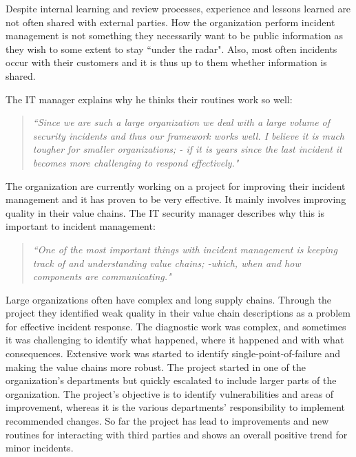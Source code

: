 Despite internal learning and review processes, experience and lessons learned are not often shared with external parties. How the organization perform incident management is not something they necessarily want to be public information as they wish to some extent to stay ``under the radar". Also, most often incidents occur with their customers and it is thus up to them whether information is shared. 

The IT manager explains why he thinks their routines work so well:
\begin{quote}
\textit{``Since we are such a large organization we deal with a large volume of security incidents and thus our framework works well. I believe it is much tougher for smaller organizations; - if it is years since the last incident it becomes more challenging to respond effectively."}
\end{quote}

The organization are currently working on a project for improving their incident management and it has proven to be very effective. It mainly involves improving quality in their value chains. The IT security manager describes why this is important to incident management:
\begin{quote}
\textit{``One of the most important things with incident management is keeping track of and understanding value chains; -which, when and how components are communicating."}
\end{quote}
Large organizations often have complex and long supply chains. Through the project they identified weak quality in their value chain descriptions as a problem for effective incident response. The diagnostic work was complex, and sometimes it was challenging to identify what happened, where it happened and with what consequences. Extensive work was started to identify single-point-of-failure and making the value chains more robust. The project started in one of the organization's departments but quickly escalated to include larger parts of the organization. The project's objective is to identify vulnerabilities and areas of improvement, whereas it is the various departments' responsibility to implement recommended changes. So far the project has lead to improvements and new routines for interacting with third parties and shows an overall positive trend for minor incidents. 